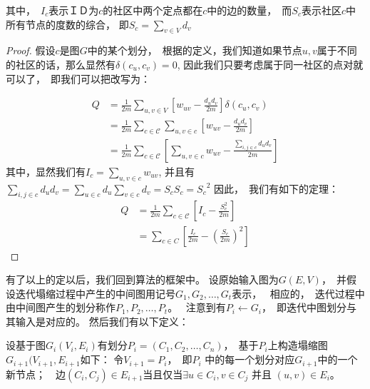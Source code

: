 \documentclass[master]{njuthesis}
\begin{document}
其中，　$I_c$表示ＩＤ为$c$的社区中两个定点都在$c$中的边的数量，　而$S_c$表示社区$c$中所有节点的度数的综合，
即$S_c = \sum\limits_{v \in V} {d_v}$
\begin{proof}
假设$c$是图$G$中的某个划分，　根据\label{eq:modularity}的定义，我们知道如果节点$u, v$属于不同的社区的话，那么显然有$\delta(c_u, c_v)=0$,
因此我们只要考虑属于同一社区的点对就可以了，　即我们可以把\label{eq:modularity}改写为：

\begin{equation}
\begin{aligned}
Q &= \frac{1}{2m}\sum\limits_{u, v \in V} \left[w_{uv} - \frac{{d_u}{d_v}}{2m} \right]\delta(c_u, c_v) \\
& = \frac{1}{2m}\sum\limits_{c \in \mathcal{C}} {\sum\limits_{u, v \in c} { \left[w_{uv} - \frac{{d_u}{d_v}}{2m} \right]}} \\
& = \frac{1}{2m}\sum\limits_{c \in \mathcal{C}} \left[{\sum\limits_{u, v \in c} { w_{uv} - \frac{\sum\nolimits_{i,j \in c}{{d_u}{d_v}}}{2m}}}\right] 
\end{aligned}
\end{equation}
其中，显然我们有$I_c=\sum\nolimits_{u, v \in c}  w_{uv}$, 
并且有$\sum\nolimits_{i,j \in c}{{d_u}{d_v}} =
\sum\nolimits_{u \in c}{d_u} \sum\nolimits_{v \in c}{d_v} = S_c S_c = {S_c}^2$
因此，　我们有如下的定理：
\begin{equation}
\begin{aligned}
Q &= \frac{1}{2m}\sum\limits_{c \in \mathcal{C}} \left[I_c - \frac{S_c^2}{2m} \right] \\
& = \sum\limits_{c \in C} \left[\frac{I_c}{2m} - {\left(\frac{S_c}{2m}\right)}^2 \right]
\end{aligned}
\end{equation}
\end{proof}
有了以上的定以后，我们回到算法\label{algo:mlgp}的框架中。
设原始输入图为$G(E,V)$，　并假设迭代塌缩过程中产生的中间图用记号$G_1, G_2, \dots, G_t$表示，　
相应的，　迭代过程中由中间图产生的划分称作$P_1, P_2, \dots, P_{t}$。　
注意到有$P_i \gets G_i$，　即迭代中图划分与其输入是对应的。
然后我们有以下定义：
\begin{definition}
 设基于图$G_i(V_i, E_i)$有划分$P_i=(C_1, C_2, \dots, C_n)$，　基于$P_i$上构造塌缩图$G_{i+1}(V_{i+1}, E_{i+1}$如下：
 令$V_{i+1} = P_i$，　即$P_i$ 中的每一个划分对应$G_{i+1}$中的一个新节点；　边$(C_i, C_j) \in E_{i+1}$当且仅当$\exists
 u \in C_i, v \in C_j$ 并且 $(u, v) \in E_i$。
\end{definition}
\end{document}
